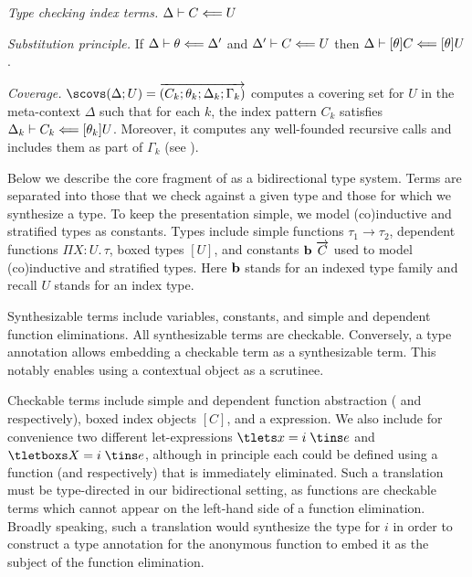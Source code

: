 \begin{description}
\item \emph{Type checking index terms.} $\Delta \vdash C \Longleftarrow U$
\item \emph{Substitution principle.} If $\Delta \vdash \theta \Longleftarrow \Delta'$ and $\Delta' \vdash C \Longleftarrow U$ then
  $\Delta \vdash [\theta]C \Longleftarrow [\theta]U$.
\item \emph{Coverage.}
  $\scovs (\Delta; U) = \vec{(C_k; \theta_k; \Delta_k; \Gamma_k)}$
  computes a covering set for $U$ in the meta-context $\Delta$
  such that for each $k$, the index pattern $C_k$ satisfies
  $\Delta_k \vdash C_k \Longleftarrow [\theta_k]U$.
  Moreover, it computes any well-founded recursive calls and includes them as
  part of $\Gamma_k$ (see \cite{Pientka:TLCA15}).
\end{description}


Below we describe the core fragment of \Beluga{} as a bidirectional type system.
Terms are separated into those that we check against a given type and those for
which we synthesize a type.
To keep the presentation simple, we model (co)inductive and stratified types as
constants.
Types include simple functions $\tau_1 \to \tau_2$,
dependent functions $\Pi X{:}U.\,\tau$,
boxed types $[U]$, and constants $\textbf{b}~\overrightarrow{C}$ used to model (co)inductive
and stratified types.
Here $\textbf{b}$ stands for an indexed type family and recall $U$ stands for an
index type.
%

%
Synthesizable terms include variables, constants, and simple and dependent
function eliminations.
All synthesizable terms are checkable.
Conversely, a type annotation allows embedding a checkable term as a
synthesizable term.
This notably enables using a contextual object as a \tcases scrutinee.

Checkable terms include simple and dependent function abstraction (\tfn{} and
\tmlam{} respectively), boxed index objects $[C]$, and a \tcases expression.
We also include for convenience two different let-expressions
$\tlets x = i\;\tins e$ and $\tletboxs X = i\;\tins e$,
although in principle each could be defined using a function (\tfns and \tmlams
respectively) that is immediately eliminated.
Such a translation must be type-directed in our bidirectional setting, as
functions are checkable terms which cannot appear on the left-hand side of a
function elimination.
Broadly speaking, such a translation would synthesize the type for $i$ in order
to construct a type annotation for the anonymous function to embed it as the
subject of the function elimination.

